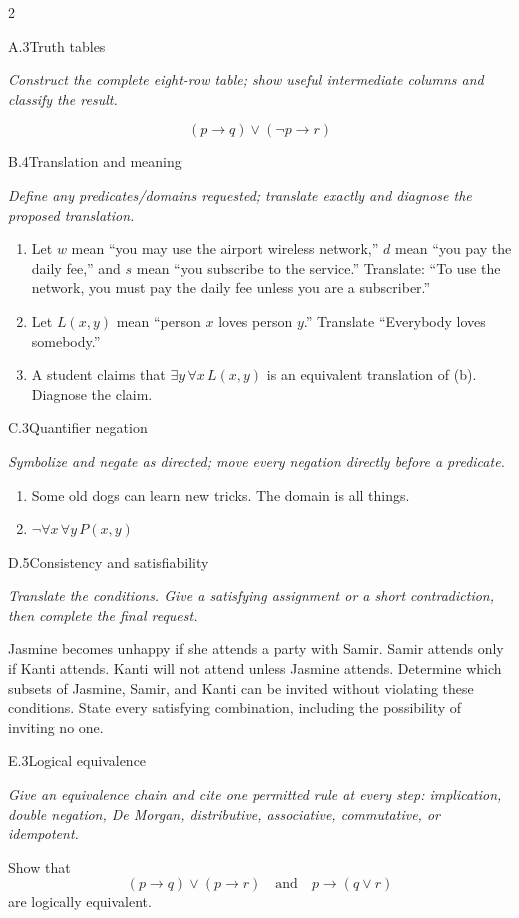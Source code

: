 \documentclass[9pt]{extarticle}
\begin{document}
\CoreWorkArea
\FormBreak
{}
\begin{multicols}{2}
\begin{CoreProblem}{A.3}{Truth tables}
{\scriptsize\textit{Construct the complete eight-row table; show useful intermediate columns and classify the result.}\par}
\[
  (p\to q)\lor(\neg p\to r)
\]
\end{CoreProblem}
\begin{CoreProblem}{B.4}{Translation and meaning}
{\scriptsize\textit{Define any predicates/domains requested; translate exactly and diagnose the proposed translation.}\par}
\begin{enumerate}[label=(\alph*)]
  \item Let $w$ mean ``you may use the airport wireless network,'' $d$ mean
        ``you pay the daily fee,'' and $s$ mean ``you subscribe to the
        service.'' Translate: ``To use the network, you must pay the daily fee
        unless you are a subscriber.''
  \item Let $L(x,y)$ mean ``person $x$ loves person $y$.'' Translate
        ``Everybody loves somebody.''
  \item A student claims that $\exists y\,\forall x\,L(x,y)$ is an equivalent
        translation of (b). Diagnose the claim.
\end{enumerate}
\end{CoreProblem}
\begin{CoreProblem}{C.3}{Quantifier negation}
{\scriptsize\textit{Symbolize and negate as directed; move every negation directly before a predicate.}\par}
\begin{enumerate}[label=(\alph*)]
  \item Some old dogs can learn new tricks. The domain is all things.
  \item $\neg\forall x\,\forall y\,P(x,y)$
\end{enumerate}
\end{CoreProblem}
\columnbreak
\begin{CoreProblem}{D.5}{Consistency and satisfiability}
{\scriptsize\textit{Translate the conditions. Give a satisfying assignment or a short contradiction, then complete the final request.}\par}
Jasmine becomes unhappy if she attends a party with Samir. Samir attends only
if Kanti attends. Kanti will not attend unless Jasmine attends. Determine which
subsets of Jasmine, Samir, and Kanti can be invited without violating these
conditions. State every satisfying combination, including the possibility of
inviting no one.
\end{CoreProblem}
\begin{CoreProblem}{E.3}{Logical equivalence}
{\scriptsize\textit{Give an equivalence chain and cite one permitted rule at every step: implication, double negation, De Morgan, distributive, associative, commutative, or idempotent.}\par}
Show that
\[
  (p\to q)\lor(p\to r)
  \quad\text{and}\quad
  p\to(q\lor r)
\]
are logically equivalent.
\end{CoreProblem}
\end{multicols}
\end{document}
